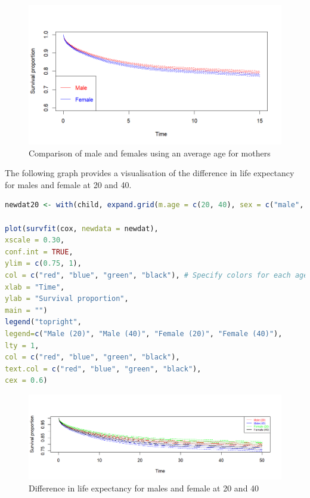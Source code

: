 \documentclass[12pt,letterpaper]{article}
\begin{document}
\begin{figure}[htbp]
	\centering
	\includegraphics[width=1\linewidth]{Rplot03}
	\caption{Comparison of male and females using an average age for mothers}
	\label{fig:rplot01}
\end{figure}

\newpage
\noindent The following graph provides a visualisation of the difference in life expectancy for males and female at 20 and 40.

\begin{lstlisting}[language=R]
newdat20 <- with(child, expand.grid(m.age = c(20, 40), sex = c("male", "female")))

plot(survfit(cox, newdata = newdat), 
xscale = 0.30,
conf.int = TRUE,
ylim = c(0.75, 1),
col = c("red", "blue", "green", "black"), # Specify colors for each age group and sex
xlab = "Time",
ylab = "Survival proportion",
main = "")
legend("topright",
legend=c("Male (20)", "Male (40)", "Female (20)", "Female (40)"), 
lty = 1, 
col = c("red", "blue", "green", "black"),
text.col = c("red", "blue", "green", "black"),
cex = 0.6)

\end{lstlisting}

\begin{figure}[htbp]
	\centering
	\includegraphics[width=1\linewidth, height=0.3\textheight]{Rplot04}
	\caption{Difference in life expectancy for males and female at 20 and 40}
	\label{fig:rplot04}
\end{figure}
\end{document}
